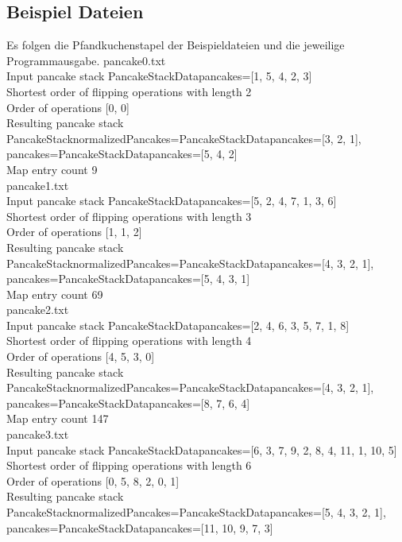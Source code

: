 \subsection{Beispiel Dateien}\label{subsec:beispiel-dateien}
Es folgen die Pfandkuchenstapel der Beispieldateien und die jeweilige Programmausgabe.
pancake0.txt \\
Input pancake stack PancakeStackData{pancakes=[1, 5, 4, 2, 3]} \\
Shortest order of flipping operations with length 2 \\
Order of operations [0, 0] \\
Resulting pancake stack PancakeStack{normalizedPancakes=PancakeStackData{pancakes=[3, 2, 1]}, pancakes=PancakeStackData{pancakes=[5, 4, 2]}} \\
Map entry count 9 \\
pancake1.txt \\
Input pancake stack PancakeStackData{pancakes=[5, 2, 4, 7, 1, 3, 6]} \\
Shortest order of flipping operations with length 3 \\
Order of operations [1, 1, 2] \\
Resulting pancake stack PancakeStack{normalizedPancakes=PancakeStackData{pancakes=[4, 3, 2, 1]}, pancakes=PancakeStackData{pancakes=[5, 4, 3, 1]}} \\
Map entry count 69 \\
pancake2.txt \\
Input pancake stack PancakeStackData{pancakes=[2, 4, 6, 3, 5, 7, 1, 8]} \\
Shortest order of flipping operations with length 4 \\
Order of operations [4, 5, 3, 0] \\
Resulting pancake stack PancakeStack{normalizedPancakes=PancakeStackData{pancakes=[4, 3, 2, 1]}, pancakes=PancakeStackData{pancakes=[8, 7, 6, 4]}} \\
Map entry count 147 \\
pancake3.txt \\
Input pancake stack PancakeStackData{pancakes=[6, 3, 7, 9, 2, 8, 4, 11, 1, 10, 5]} \\
Shortest order of flipping operations with length 6 \\
Order of operations [0, 5, 8, 2, 0, 1] \\
Resulting pancake stack PancakeStack{normalizedPancakes=PancakeStackData{pancakes=[5, 4, 3, 2, 1]}, pancakes=PancakeStackData{pancakes=[11, 10, 9, 7, 3]}} \\
